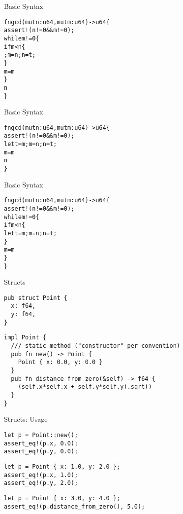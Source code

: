 
\begin{frame}[fragile]{Basic Syntax}
\begin{alltt}
fn gcd(mut n: u64, mut m: u64) -> u64 \{
    assert!(n != 0 && m != 0);
    while m != 0 \{
        if m < n \{
            ; m = n; n = t;
        \}
        m = m % n;
    \}
    n
\}
\end{alltt}
\end{frame}


\begin{frame}[fragile]{Basic Syntax}
\begin{alltt}
fn gcd(mut n: u64, mut m: u64) -> u64 \{
    assert!(n != 0 && m != 0);
            let t = m; m = n; n = t;
        \hi{\}}
        m = m % n;
    \hi{\}}
    n
\}
\end{alltt}
\end{frame}


\begin{frame}[fragile]{Basic Syntax}
\begin{alltt}
fn gcd(mut n: u64, mut m: u64) -> u64 \{
    assert!(n != 0 && m != 0);
    while m != 0 \{
        if m < n \{
            let t = m; m = n; n = t;
        \}
        m = m % n;
    \}
\}
\end{alltt}
\end{frame}


\begin{frame}[fragile]{Structs}
\pause\begin{verbatim}
pub struct Point {
  x: f64,
  y: f64,
}
\end{verbatim}
\pause
\begin{verbatim}
impl Point {
  /// static method ("constructor" per convention)
  pub fn new() -> Point {
    Point { x: 0.0, y: 0.0 }
  }
  pub fn distance_from_zero(&self) -> f64 {
    (self.x*self.x + self.y*self.y).sqrt()
  }
}
\end{verbatim}
\end{frame}

\begin{frame}[fragile]{Structs: Usage}
\begin{verbatim}
let p = Point::new();
assert_eq!(p.x, 0.0);
assert_eq!(p.y, 0.0);
\end{verbatim}
\begin{verbatim}
let p = Point { x: 1.0, y: 2.0 };
assert_eq!(p.x, 1.0);
assert_eq!(p.y, 2.0);
\end{verbatim}
\begin{verbatim}
let p = Point { x: 3.0, y: 4.0 };
assert_eq!(p.distance_from_zero(), 5.0);
\end{verbatim}
\end{frame}

